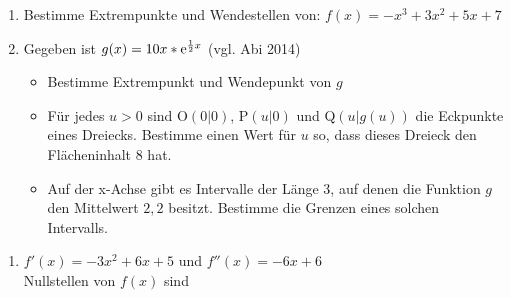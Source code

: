 \begin{enumerate}
	\item Bestimme Extrempunkte und Wendestellen von: $f(x)=-x^3+3x^2+5x+7$
	
	\item Gegeben ist $g(x)=10x*\mathrm{e}^{\frac{1}{2}x}$ (vgl. Abi 2014)\begin{itemize}
		\item Bestimme Extrempunkt und Wendepunkt von $g$
		\item Für jedes $u>0$ sind O$(0|0)$, P$(u|0)$ und Q$(u|g(u))$ die Eckpunkte eines Dreiecks. Bestimme einen Wert für $u$ so, dass dieses Dreieck den Flächeninhalt $8$ hat.
		\item Auf der x-Achse gibt es Intervalle der Länge 3, auf denen die Funktion $g$ den Mittelwert $2,2$ besitzt. Bestimme die Grenzen eines solchen Intervalls.
	\end{itemize}
	
\end{enumerate}

\begin{lsg}{}
\begin{enumerate}
	\item $f'(x)=-3x^2+6x+5$ und 
	$f''(x)=-6x+6$\\
	Nullstellen von $f(x)$ sind 
\end{enumerate}
\end{lsg}


